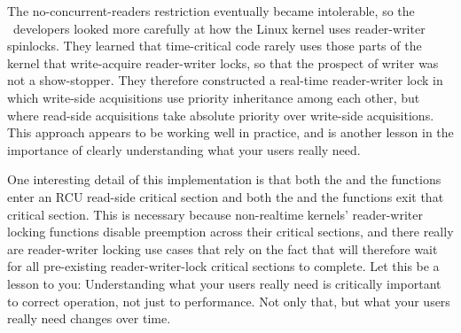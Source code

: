\QuickQuizEnd

The no-concurrent-readers restriction eventually became intolerable, so
the \rt\ developers looked more carefully at how the Linux kernel uses
reader-writer spinlocks.
They learned that time-critical code rarely uses those parts of the
kernel that write-acquire reader-writer locks, so that the prospect
of writer  was not a show-stopper.
They therefore constructed a real-time reader-writer lock in which
write-side acquisitions use priority inheritance among each other,
but where read-side acquisitions take absolute priority over
write-side acquisitions.
This approach appears to be working well in practice, and is another
lesson in the importance of clearly understanding what your users
really need.

One interesting detail of this implementation is that both the
 and the  functions enter an RCU
read-side critical section and both the  and the
 functions exit that critical section.
This is necessary because non-realtime kernels' reader-writer locking
functions disable preemption across their critical sections, and
there really are reader-writer locking use cases that rely on the fact
that  will therefore wait for all pre-existing
reader-writer-lock critical sections to complete.
Let this be a lesson to you:
Understanding what your users really need is critically important to
correct operation, not just to performance.
Not only that, but what your users really need changes over time.

